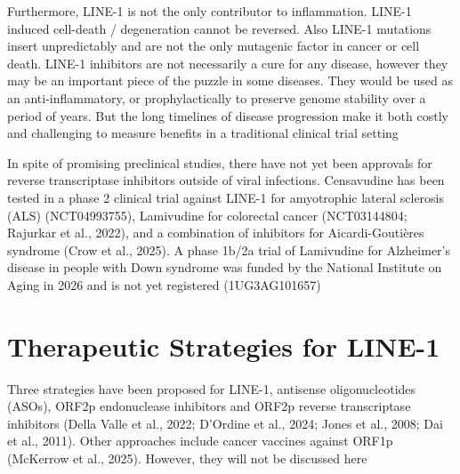 \documentclass[11pt,twocolumn,twoside]{extarticle}
\begin{document}
Furthermore, LINE-1 is not the only contributor to inflammation. LINE-1 induced cell-death / degeneration cannot be reversed. Also LINE-1 mutations insert unpredictably and are not the only mutagenic factor in cancer or cell death. LINE-1 inhibitors are not necessarily a cure for any disease, however they may be an important piece of the puzzle in some diseases. They would be used as an anti-inflammatory, or prophylactically to preserve genome stability over a period of years. But the long timelines of disease progression make it both costly and challenging to measure benefits in a traditional clinical trial setting

In spite of promising preclinical studies, there have not yet been approvals for reverse transcriptase inhibitors outside of viral infections. Censavudine has been tested in a phase 2 clinical trial against LINE-1 for amyotrophic lateral sclerosis (ALS) (NCT04993755), Lamivudine for colorectal cancer (NCT03144804; Rajurkar et al., 2022), and a combination of inhibitors for Aicardi-Gouti\`eres syndrome (Crow et al., 2025). A phase 1b/2a trial of Lamivudine for Alzheimer's disease in people with Down syndrome was funded by the National Institute on Aging in 2026 and is not yet registered (1UG3AG101657)

\section{Therapeutic Strategies for LINE-1}
Three strategies have been proposed for LINE-1, antisense oligonucleotides (ASOs), ORF2p endonuclease inhibitors and ORF2p reverse transcriptase inhibitors (Della Valle et al., 2022; D'Ordine et al., 2024; Jones et al., 2008; Dai et al., 2011). Other approaches include cancer vaccines against ORF1p (McKerrow et al., 2025). However, they will not be discussed here
\end{document}
